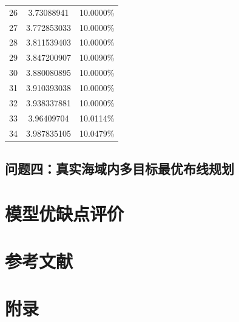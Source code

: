 \documentclass{article}
\begin{document}
\begin{table}[H]
\begin{tabular}{ccc}
			26    & 3.73088941      & 10.0000\%     \\
			27    & 3.772853033     & 10.0000\%     \\
			28    & 3.811539403     & 10.0000\%     \\
			29    & 3.847200907     & 10.0090\%     \\
			30    & 3.880080895     & 10.0000\%     \\
			31    & 3.910393038     & 10.0000\%     \\
			32    & 3.938337881     & 10.0000\%     \\
			33    & 3.96409704      & 10.0114\%     \\
			34    & 3.987835105     & 10.0479\%     \\ \hline
		\end{tabular}
	\end{table}
	




\subsection{问题四：真实海域内多目标最优布线规划}

\section{模型优缺点评价}

\section*{参考文献}
% 
% 
	
	
\section*{附录}
	
	
	
	
	
\end{document}
